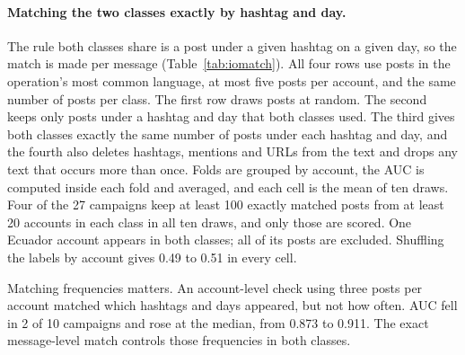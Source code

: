 \documentclass[10pt,a4paper]{article}
\begin{document}
\paragraph{Matching the two classes exactly by hashtag and day.}
The rule both classes share is a post under a given hashtag on a given day, so the match is made
  per message (Table~\ref{tab:iomatch}).
All four rows use posts in the operation's most common language, at most five posts per account,
  and the same number of posts per class.
The first row draws posts at random.
The second keeps only posts under a hashtag and day that both classes used.
The third gives both classes exactly the same number of posts under each hashtag and day, and the
  fourth also deletes hashtags, mentions and URLs from the text and drops any text that occurs more
  than once.
Folds are grouped by account, the AUC is computed inside each fold and averaged, and each cell is
  the mean of ten draws.
Four of the 27 campaigns keep at least 100 exactly matched posts from at least 20 accounts in each
  class in all ten draws, and only those are scored.
One Ecuador account appears in both classes; all of its posts are excluded.
Shuffling the labels by account gives 0.49 to 0.51 in every cell.

Matching frequencies matters.
An account-level check using three posts per account matched which hashtags and days appeared,
  but not how often.
AUC fell in 2 of 10 campaigns and rose at the median, from 0.873 to 0.911.
The exact message-level match controls those frequencies in both classes.
\end{document}
